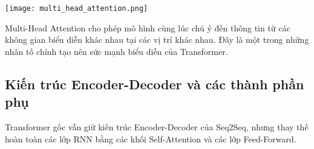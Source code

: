 \begin{center}
    \texttt{[image: multi\_head\_attention.png]}
    \label{fig:multi_head_attention}
\end{center}

Multi-Head Attention cho phép mô hình cùng lúc chú ý đến thông tin từ các không gian biểu diễn khác nhau tại các vị trí khác nhau. Đây là một trong những nhân tố chính tạo nên sức mạnh biểu diễn của Transformer.

\subsection{Kiến trúc Encoder-Decoder và các thành phần phụ}
\label{ssec:transformer_architecture}
Transformer gốc vẫn giữ kiến trúc Encoder-Decoder của Seq2Seq, nhưng thay thế hoàn toàn các lớp RNN bằng các khối Self-Attention và các lớp Feed-Forward.


